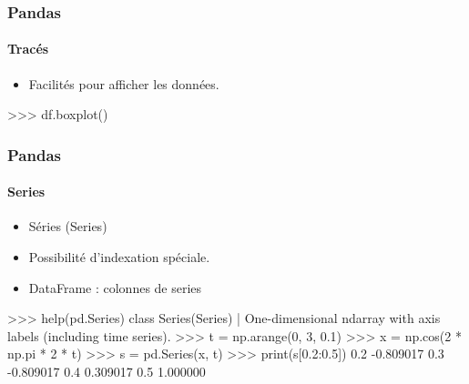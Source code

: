 \begin{frame}[fragile]
\frametitle{Pandas}
\framesubtitle{Tracés}
\begin{itemize}
 \item Facilités pour afficher les données. 
\end{itemize}
\begin{pythonConsole}
>>> df.boxplot()
\end{pythonConsole}
\begin{center}
\end{center}
\end{frame}
\begin{frame}[fragile]
\frametitle{Pandas}
\framesubtitle{Series}
\begin{itemize}
 \item Séries (Series)
 \item Possibilité d'indexation spéciale.
 \item DataFrame : colonnes de series
\end{itemize}

\begin{pythonConsole}
>>> help(pd.Series)
class Series(Series)
 |  One-dimensional ndarray with axis labels (including time series).
>>> t = np.arange(0, 3, 0.1)
>>> x = np.cos(2 * np.pi * 2 * t)
>>> s = pd.Series(x, t)
>>> print(s[0.2:0.5])
0.2   -0.809017
0.3   -0.809017
0.4    0.309017
0.5    1.000000
\end{pythonConsole}
\end{frame}
